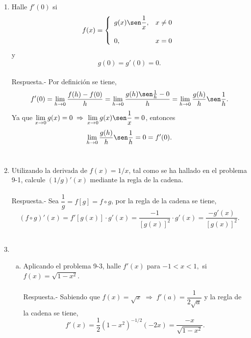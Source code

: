 \begin{enumerate}[\bfseries 1.]
    \item Halle $f'(0)$ si 
	$$f(x)=\left\{\begin{array}{ll}
		g(x)\sen \dfrac{1}{x},&x\neq 0\\\\
		0,&x=0\\
	\end{array}\right.$$
	 y $$g(0)=g'(0)=0.$$\\
	 Respuesta.-\; Por definición se tiene,
	 $$f'(0)=\lim\limits_{h\to 0}\dfrac{f(h)-f(0)}{h}=\lim\limits_{h\to 0}\dfrac{g(h)\sen \frac{1}{h}-0}{h}=\lim\limits_{h\to 0}\dfrac{g(h)}{h}\sen \dfrac{1}{h}.$$
	 Ya que $\lim\limits_{x \to 0} g(x)=0 \; \Rightarrow \; \lim\limits_{x\to 0}g(x)\sen \dfrac{1}{x}=0$, entonces
	 $$\lim\limits_{h\to 0}\dfrac{g(h)}{h}\sen\dfrac{1}{h}=0=f'(0).$$\\

     \item Utilizando la derivada de $f(x)=1/x$, tal como se ha hallado en el problema 9-1, calcule $(1/g)'(x)$ mediante la regla de la cadena.\\\\
	 Respuesta.-\; Sea $\dfrac{1}{g}=f\left[g\right]=f\circ g$,  por la regla de la cadena se tiene,
	 $$\left(f\circ g\right)'(x)=f'\left[g(x)\right]\cdot g'(x)=\dfrac{-1}{\left[g(x)\right]^2}\cdot g'(x)=\dfrac{-g'(x)}{\left[g(x)\right]^2}.$$\\

     \item 
	 \begin{enumerate}[(a)]

	     \item Aplicando el problema 9-3, halle $f'(x)$ para $-1<x<1,$ si $f(x)=\sqrt{1-x^2}$.\\\\
		 Respuesta.-\; Sabiendo que $f(x)=\sqrt{x}\;\Rightarrow \; f'(a)=\dfrac{1}{2\sqrt{a}}$ y la regla de la cadena se tiene,
		 $$f'(x)=\dfrac{1}{2}(1-x^2)^{-1/2}(-2x)=\dfrac{-x}{\sqrt{1-x^2}}.$$\\


\end{enumerate}
\end{enumerate}
